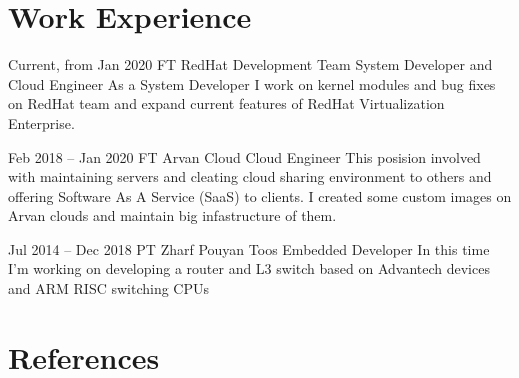 \documentclass[
	10pt, %
]{FreemanCV}
\begin{document}
\begin{paracol}{2}
\section{Work Experience}





\jobentry
	{Current, from Jan 2020} %
	{FT} %
	{RedHat Development Team} %
	{System Developer and Cloud Engineer} %
	{As a System Developer I work on kernel modules and bug fixes on RedHat team and expand current features of RedHat Virtualization Enterprise.} %


\jobentry
	{Feb 2018 -- Jan 2020} %
	{FT} %
	{Arvan Cloud} %
	{Cloud Engineer} %
	{This posision involved with maintaining servers and cleating cloud sharing environment to others and offering Software As A Service (SaaS) to clients. I created some custom images on Arvan clouds and maintain big infastructure of them.} %


\jobentry
	{Jul 2014 -- Dec 2018} %
	{PT} %
	{Zharf Pouyan Toos} %
	{Embedded Developer} %
	{In this time I'm working on developing a router and L3 switch based on Advantech devices and ARM RISC switching CPUs} %


\section{References}



\end{paracol}
\end{document}
